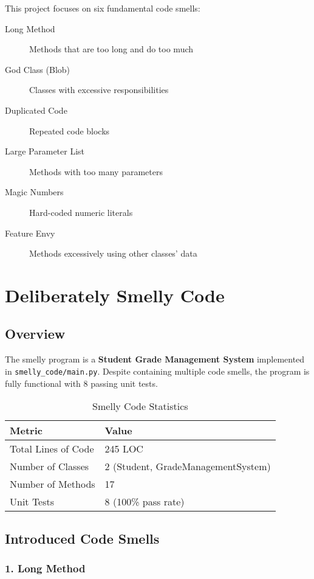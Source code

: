\documentclass[11pt,a4paper]{article}
\begin{document}
This project focuses on six fundamental code smells:

\begin{description}
    \item[Long Method] Methods that are too long and do too much
    \item[God Class (Blob)] Classes with excessive responsibilities
    \item[Duplicated Code] Repeated code blocks
    \item[Large Parameter List] Methods with too many parameters
    \item[Magic Numbers] Hard-coded numeric literals
    \item[Feature Envy] Methods excessively using other classes' data
\end{description}

\section{Deliberately Smelly Code}

\subsection{Overview}

The smelly program is a \textbf{Student Grade Management System} implemented in \texttt{smelly\_code/main.py}. Despite containing multiple code smells, the program is fully functional with 8 passing unit tests.

\begin{table}[h]
\centering
\caption{Smelly Code Statistics}
\begin{tabular}{@{}ll@{}}
\toprule
\textbf{Metric} & \textbf{Value} \\
\midrule
Total Lines of Code & 245 LOC \\
Number of Classes & 2 (Student, GradeManagementSystem) \\
Number of Methods & 17 \\
Unit Tests & 8 (100\% pass rate) \\
\bottomrule
\end{tabular}
\end{table}

\subsection{Introduced Code Smells}

\subsubsection{1. Long Method}
\end{document}
